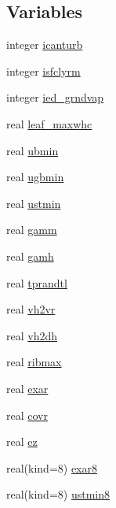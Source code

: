 \subsection*{Variables}
\begin{DoxyCompactItemize}
\item 
integer \hyperlink{namespacecanopy__air__coms_ad7c5174d5bc6bd090e9afff63a3428b4}{icanturb}
\item 
integer \hyperlink{namespacecanopy__air__coms_a25351371b3a5e30c3cabd058d1153399}{isfclyrm}
\item 
integer \hyperlink{namespacecanopy__air__coms_a1c11559607f1960e926e0e2adebdba1b}{ied\+\_\+grndvap}
\item 
real \hyperlink{namespacecanopy__air__coms_aaaf296c47691fcf3aaab5b8929b37368}{leaf\+\_\+maxwhc}
\item 
real \hyperlink{namespacecanopy__air__coms_ac8fd39daadba6dc58037eaf42f48700e}{ubmin}
\item 
real \hyperlink{namespacecanopy__air__coms_a593e8ef887b3317fb55545892af84c50}{ugbmin}
\item 
real \hyperlink{namespacecanopy__air__coms_a9a2322371ed4847814fa98174c092c12}{ustmin}
\item 
real \hyperlink{namespacecanopy__air__coms_abb236f0b21abecb4efde793fd6a1811d}{gamm}
\item 
real \hyperlink{namespacecanopy__air__coms_aec7b65c44519ebe9058cb6c4aa655e8c}{gamh}
\item 
real \hyperlink{namespacecanopy__air__coms_adafee179c1e8ba89437987bc4be9b781}{tprandtl}
\item 
real \hyperlink{namespacecanopy__air__coms_a2ac951854c77e1df16229f0fee8a70a6}{vh2vr}
\item 
real \hyperlink{namespacecanopy__air__coms_ab7f6f46003b1ddabed2345c0ed33372d}{vh2dh}
\item 
real \hyperlink{namespacecanopy__air__coms_a553bcc51d0af126ebd44094dae4cdeac}{ribmax}
\item 
real \hyperlink{namespacecanopy__air__coms_a7ec65e87cc2c74a4f55e05e67272a5c0}{exar}
\item 
real \hyperlink{namespacecanopy__air__coms_a8aa4d4dbd59143c45ab4c52fb326ecd6}{covr}
\item 
real \hyperlink{namespacecanopy__air__coms_a63a4c7242b97f72a903fa4c1213b37f0}{ez}
\item 
real(kind=8) \hyperlink{namespacecanopy__air__coms_ab6719dfbc2c9e8e2f9eddf3bf6f97237}{exar8}
\item 
real(kind=8) \hyperlink{namespacecanopy__air__coms_a4afb828f3fecdf23a54cd6276f714544}{ustmin8}

\end{DoxyCompactItemize}
